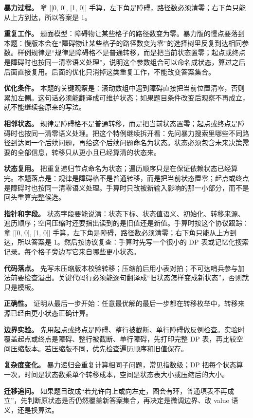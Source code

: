 \textbf{暴力过程。} 拿 [[0, 0], [1, 0]] 手算，左下角是障碍，路径数必须清零；右下角只能从上方到达，所以答案是 1。

\textbf{重复工作。} 题面模型：障碍物让某些格子的路径数变为零。暴力版的慢点要落到本题：慢版本会在“障碍物让某些格子的路径数变为零”的选择树里反复到达相同参数。样例规律是“规律是障碍格不是普通转移，而是把当前状态置零；起点或终点是障碍时也按同一清零语义处理”，说明这个参数组合可以命名成状态，算过之后后面直接复用。后面的优化只消掉这类重复工作，不能改变答案集合。

\textbf{优化条件。} 本题的关键观察是：滚动数组中遇到障碍直接把当前位置清零，否则累加左侧。这句话必须能翻译成可维护状态；如果题目条件改变后观察不再成立，就不能继续套原来的写法。

\textbf{相邻状态。} 规律是障碍格不是普通转移，而是把当前状态置零；起点或终点是障碍时也按同一清零语义处理。把这个特例继续拆开看：先问暴力搜索里哪些不同路径到达同一个后续问题，再给这个后续问题命名为状态。状态必须包含未来决策需要的全部信息，转移只从更小且已经算清的状态来。

\textbf{状态复用。} 把重复递归节点命名为状态；遍历顺序只是在保证依赖状态已经算完。本题落点是：规律是障碍格不是普通转移，而是把当前状态置零；起点或终点是障碍时也按同一清零语义处理。手算时只改被新输入影响的那一小部分，而不是回头重算完整候选。

\textbf{指针和字段。} 状态字段要能说清：状态下标、状态值语义、初始化、转移来源、遍历顺序；空间压缩时还要指出读到的是旧值还是新值。手算时按这个协议跟踪：拿 [[0, 0], [1, 0]] 手算，左下角是障碍，路径数必须清零；右下角只能从上方到达，所以答案是 1。然后按协议复查：手算时先写一个很小的 DP 表或记忆化搜索记录。每个格子旁边写它来自哪些更小状态。

\textbf{代码落点。} 先写未压缩版本校验转移；压缩前后用小表对拍；不可达哨兵参与加法前要检查溢出。关键代码行必须能逐句翻译成“旧状态怎样变成新状态”，否则就只是模板。

\textbf{正确性。} 证明从最后一步开始：任意最优解的最后一步都在转移枚举中，转移来源已经由更小状态正确计算。

\textbf{边界实验。} 先用起点或终点是障碍、整行被截断、单行障碍做反例检查。实验时覆盖起点或终点是障碍、整行被截断、单行障碍，先打印完整 DP 表，再比较空间压缩版本。若压缩版不同，优先检查遍历顺序和旧值保存。

\textbf{复杂度变化。} 暴力递归会重复计算相同子问题，常见指数级；DP 把每个状态算一次，时间是状态数乘单个转移成本，空间是状态表大小或压缩后的大小。

\textbf{迁移追问。} 如果题目改成“若允许向上或向左走，图会有环，普通填表不再成立”，先判断原状态是否仍然覆盖新答案集合，再决定是微调边界、改 value 语义，还是换算法。

